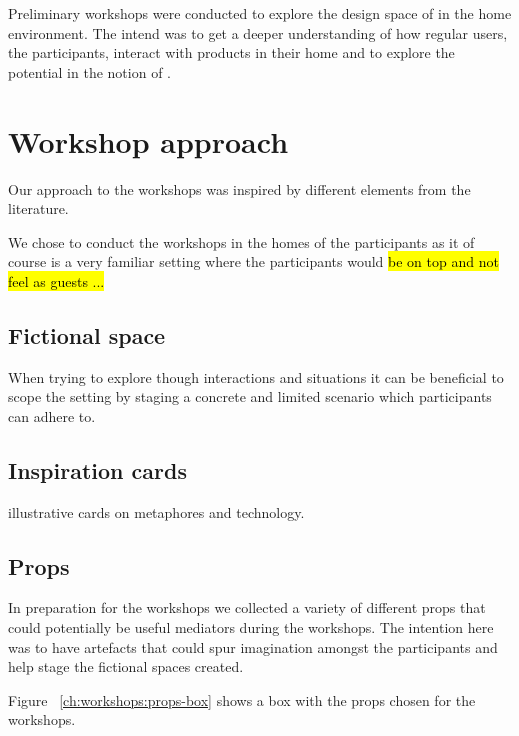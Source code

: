 Preliminary workshops were conducted to explore the design space of  in the home environment.
The intend was to get a deeper understanding of how regular users, the participants, interact with products in their home and to explore the potential in the notion of .

\section{Workshop approach}

Our approach to the workshops was inspired by different elements from the literature. \todo{\dots}

We chose to conduct the workshops in the homes of the participants as it of course is a very familiar setting where the participants would \hl{be on top and not feel as guests ...}

\subsection{Fictional space}


When trying to explore though interactions and situations it can be beneficial to scope the setting by staging a concrete and limited scenario which participants can adhere to.


\subsection{Inspiration cards}

illustrative cards on metaphores and technology.

\subsection{Props}


In preparation for the workshops we collected a variety of different props that could potentially be useful mediators during the workshops.
The intention here was to have artefacts that could spur imagination amongst the participants and help stage the fictional spaces created.

Figure ~\ref{ch:workshops:props-box} shows a box with the props chosen for the workshops.


